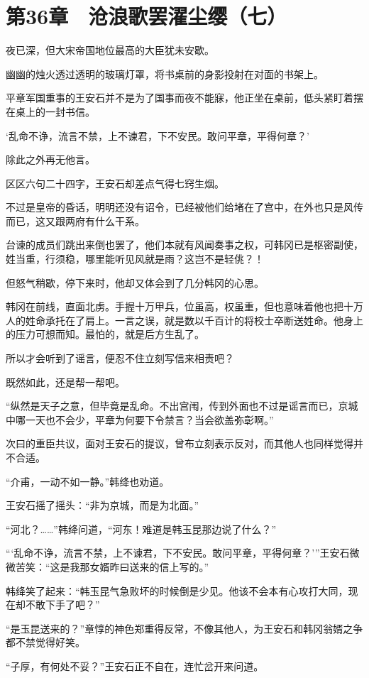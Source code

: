 \section{第36章　沧浪歌罢濯尘缨（七）}

夜已深，但大宋帝国地位最高的大臣犹未安歇。

幽幽的烛火透过透明的玻璃灯罩，将书桌前的身影投射在对面的书架上。

平章军国重事的王安石并不是为了国事而夜不能寐，他正坐在桌前，低头紧盯着摆在桌上的一封书信。

‘乱命不诤，流言不禁，上不谏君，下不安民。敢问平章，平得何章？’

除此之外再无他言。

区区六句二十四字，王安石却差点气得七窍生烟。

不过是皇帝的昏话，明明还没有诏令，已经被他们给堵在了宫中，在外也只是风传而已，这又跟两府有什么干系。

台谏的成员们跳出来倒也罢了，他们本就有风闻奏事之权，可韩冈已是枢密副使，姓当重，行须稳，哪里能听见风就是雨？这岂不是轻佻？！

但怒气稍歇，停下来时，他却又体会到了几分韩冈的心思。

韩冈在前线，直面北虏。手握十万甲兵，位虽高，权虽重，但也意味着他也把十万人的姓命承托在了肩上。一言之误，就是数以千百计的将校士卒断送姓命。他身上的压力可想而知。最怕的，就是后方生乱了。

所以才会听到了谣言，便忍不住立刻写信来相责吧？

既然如此，还是帮一帮吧。

“纵然是天子之意，但毕竟是乱命。不出宫闱，传到外面也不过是谣言而已，京城中哪一天也不会少，平章为何要下令禁言？当会欲盖弥彰啊。”

次曰的重臣共议，面对王安石的提议，曾布立刻表示反对，而其他人也同样觉得并不合适。

“介甫，一动不如一静。”韩绛也劝道。

王安石摇了摇头：“非为京城，而是为北面。”

“河北？……”韩绛问道，“河东！难道是韩玉昆那边说了什么？”

“‘乱命不诤，流言不禁，上不谏君，下不安民。敢问平章，平得何章？’”王安石微微苦笑：“这是我那女婿昨曰送来的信上写的。”

韩绛笑了起来：“韩玉昆气急败坏的时候倒是少见。他该不会本有心攻打大同，现在却不敢下手了吧？”

“是玉昆送来的？”章惇的神色郑重得反常，不像其他人，为王安石和韩冈翁婿之争都不禁觉得好笑。

“子厚，有何处不妥？”王安石正不自在，连忙岔开来问道。

